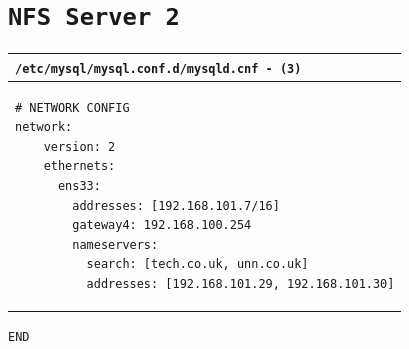 \documentclass[11pt]{article}
\begin{document}
\section{\texttt{NFS Server 2}}
\begin{table}[ht]
    \begin{tabular}{|p{17.7cm}|} 
        \hline
    \texttt{\textbf{/etc/mysql/mysql.conf.d/mysqld.cnf} - (\texttt{3})}\\ 
        \hline
        \lstset{
                basicstyle=\scriptsize\ttfamily,
        }
            \begin{lstlisting}
# NETWORK CONFIG
network:
    version: 2
    ethernets:
      ens33:
        addresses: [192.168.101.7/16]
        gateway4: 192.168.100.254
        nameservers:
          search: [tech.co.uk, unn.co.uk]
          addresses: [192.168.101.29, 192.168.101.30]
            \end{lstlisting}\\
        \hline
    \end{tabular}
\end{table}

\noindent \texttt{END}
\end{document}
